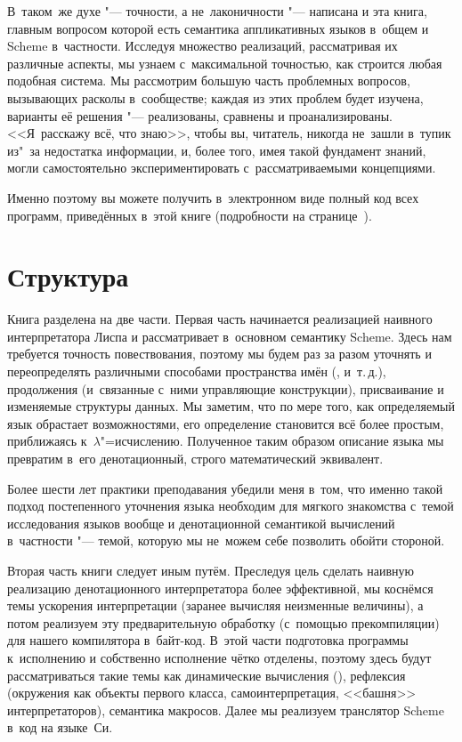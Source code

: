 В~таком~же духе "--- точности, а не~лаконичности "--- написана и эта книга,
главным вопросом которой есть семантика аппликативных языков в~общем и Scheme
в~частности. Исследуя множество реализаций, рассматривая их различные аспекты,
мы узнаем с~максимальной точностью, как строится любая подобная система. Мы
рассмотрим большую часть проблемных вопросов, вызывающих расколы в~сообществе;
каждая из этих проблем будет изучена, варианты её решения "--- реализованы,
сравнены и проанализированы. <<Я~расскажу всё, что знаю>>, чтобы вы, читатель,
никогда не~зашли в~тупик из"~за недостатка информации, и, более того, имея
такой фундамент знаний, могли самостоятельно экспериментировать
с~рассматриваемыми концепциями.

Именно поэтому вы можете получить в~электронном виде полный код всех программ,
приведённых в~этой книге (подробности на странице~\pageref{pref/sect:source}).


\section*{Структура}\label{pref/sect:structure}

Книга разделена на две части. Первая часть начинается реализацией наивного
интерпретатора Лиспа и рассматривает в~основном семантику Scheme. Здесь нам
требуется точность повествования, поэтому мы будем раз за разом уточнять и
переопределять различными способами пространства имён (,  и~т.\,д.),
продолжения (и~связанные с~ними управляющие конструкции), присваивание и
изменяемые структуры данных. Мы заметим, что по мере того, как определяемый
язык обрастает возможностями, его определение становится всё более простым,
приближаясь к~$\lambda$"=исчислению. Полученное таким образом описание языка мы
превратим в~его денотационный, строго математический эквивалент.

Более шести лет практики преподавания убедили меня в~том, что именно такой
подход постепенного уточнения языка необходим для мягкого знакомства с~темой
исследования языков вообще и денотационной семантикой вычислений в~частности
"--- темой, которую мы не~можем себе позволить обойти стороной.

Вторая часть книги следует иным путём. Преследуя цель сделать наивную
реализацию денотационного интерпретатора более эффективной, мы коснёмся темы
ускорения интерпретации (заранее вычисляя неизменные величины), а потом
реализуем эту предварительную обработку (с~помощью прекомпиляции) для нашего
компилятора в~байт-код. В~этой части подготовка программы к~исполнению и
собственно исполнение чётко отделены, поэтому здесь будут рассматриваться такие
темы как динамические вычисления (), рефлексия (окружения как объекты
первого класса, самоинтерпретация, <<башня>> интерпретаторов), семантика
макросов. Далее мы реализуем транслятор Scheme в~код на языке~Си.

